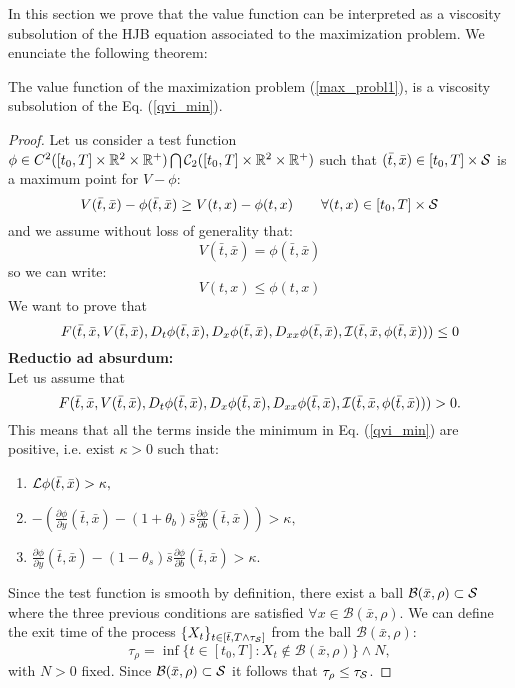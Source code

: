In this section we prove that the value function can be interpreted as a viscosity subsolution of the HJB equation associated to the maximization problem. 
We enunciate the following theorem:
\begin{Theorem}\label{subsolution_th}
 The value function of the maximization problem (\ref{max_probl1}), is a viscosity subsolution of the Eq. (\ref{qvi_min}).
\end{Theorem}
\begin{proof}
Let us consider a test function $ \phi \in C^2([t_0,T] \times \mathbb{R}^2\times \mathbb{R}^+) \bigcap \mathcal{C}_2([t_0,T] \times \mathbb{R}^2\times \mathbb{R}^+)$ such that 
$(\bar t,\bar x) \in [t_0,T] \times \mathcal{S}$ is a maximum point for $V-\phi$:
\begin{equation}
 V(\bar t,\bar x) - \phi(\bar t,\bar x) \geq V(t,x) - \phi(t, x) \hspace{2em} \forall (t,x) \in [t_0,T] \times \mathcal{S}
\end{equation}
and we assume without loss of generality that:
\begin{equation}\label{max_point}
V(\bar t,\bar x) = \phi(\bar t,\bar x)  
\end{equation}
so we can write:
\begin{equation}\label{max_point2}
V(t,x) \leq \phi(t, x) 
\end{equation}
We want to prove that
$$ F(\bar t,\bar x,V(\bar t, \bar x),D_t \phi(\bar t, \bar x),D_x \phi(\bar t, \bar x),D_{xx}\phi(\bar t, \bar x),
\mathcal{I}(\bar t, \bar x,\phi(\bar t, \bar x))) \leq 0  $$
\textbf{Reductio ad absurdum:}\\
Let us assume that 
$$F(\bar t,\bar x,V(\bar t, \bar x),D_t \phi(\bar t, \bar x),D_x \phi(\bar t, \bar x),D_{xx}\phi(\bar t, \bar x),
\mathcal{I}(\bar t,\bar x,\phi(\bar t, \bar x))) >0.$$ 
This means that all the terms inside the minimum in Eq. (\ref{qvi_min}) are positive, i.e. exist $\kappa >0$ such that:
\begin{enumerate}
 \item $ \mathcal{L} \phi(\bar t, \bar x) > \kappa ,$
 \item $-\left(\frac{\partial \phi}{\partial y}(\bar t, \bar x)
 -(1+\theta_b) \bar s \frac{\partial \phi}{\partial b}(\bar t, \bar x)\right) > \kappa,$
 \item $\frac{\partial \phi}{\partial y}(\bar t, \bar x)-(1-\theta_s) \bar s \frac{\partial \phi}{\partial b}(\bar t, \bar x) > \kappa.$
\end{enumerate}
Since the test function is smooth by definition, there exist a ball $\mathcal{B}(\bar x, \rho) \subset \mathcal{S}$
where the three previous conditions are satisfied $\forall x \in \mathcal{B}(\bar x, \rho)$. 
We can define the exit time of the process $\{X_t\}_{t \in [\bar t, T\wedge \tau_{\mathcal{S}}]}$ from the ball $\mathcal{B}(\bar x, \rho)$:
\begin{equation}
 \tau_{\rho} = \inf \{ t \in [t_0,T] : X_t \not \in \mathcal{B}(\bar x, \rho) \} \wedge N,
\end{equation}
with $N>0$ fixed.
Since $\mathcal{B}(\bar x, \rho) \subset \mathcal{S}$ it follows that $\tau_{\rho} \leq \tau_{\mathcal{S}}$.


\end{proof}

